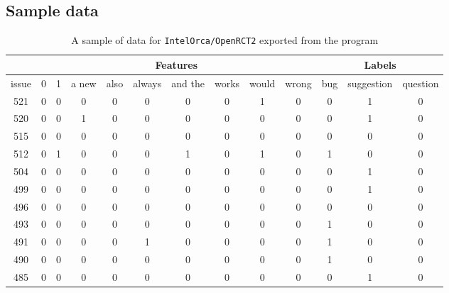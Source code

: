 \documentclass{article}
\begin{document}
\newpage

\begin{appendices}

\section{Sample data}
\begin{table}[h]
\centering
\begin{tabular}{c|c|c|c|c|c|c||c|c|c|c|c|c}
\hline
 & \multicolumn{9}{|c|}{Features} & \multicolumn{3}{|c}{Labels} \\
\hline
issue & 0 & 1 & a new & also & always & and the  &  works & would & wrong & bug & suggestion & question \\
\hline
\hline
521 & 0 & 0 & 0 & 0 & 0 & 0  &  0 & 1 & 0 & 0 & 1 & 0 \\
520 & 0 & 0 & 1 & 0 & 0 & 0  &  0 & 0 & 0 & 0 & 1 & 0 \\
515 & 0 & 0 & 0 & 0 & 0 & 0  &  0 & 0 & 0 & 0 & 0 & 0 \\
512 & 0 & 1 & 0 & 0 & 0 & 1  &  0 & 1 & 0 & 1 & 0 & 0 \\
504 & 0 & 0 & 0 & 0 & 0 & 0  &  0 & 0 & 0 & 0 & 1 & 0 \\
499 & 0 & 0 & 0 & 0 & 0 & 0  &  0 & 0 & 0 & 0 & 1 & 0 \\
496 & 0 & 0 & 0 & 0 & 0 & 0  &  0 & 0 & 0 & 0 & 0 & 0 \\
493 & 0 & 0 & 0 & 0 & 0 & 0  &  0 & 0 & 0 & 1 & 0 & 0 \\
491 & 0 & 0 & 0 & 0 & 1 & 0  &  0 & 0 & 0 & 1 & 0 & 0 \\
490 & 0 & 0 & 0 & 0 & 0 & 0  &  0 & 0 & 0 & 1 & 0 & 0 \\
485 & 0 & 0 & 0 & 0 & 0 & 0  &  0 & 0 & 0 & 0 & 1 & 0 \\
\hline
\end{tabular}
\caption{A sample of data for \texttt{IntelOrca/OpenRCT2} exported from the program}
\label{tab:sample_data}
\end{table}


\end{appendices}
\end{document}
